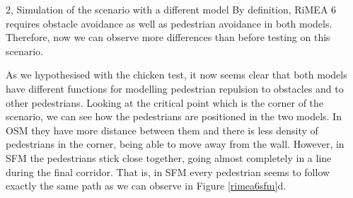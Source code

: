 \begin{task}{2, Simulation of the scenario with a different model}
By definition, RiMEA 6 requires obstacle avoidance as well as pedestrian avoidance in both models. Therefore, now we can observe more differences than before testing on this scenario.

As we hypothesised with the chicken test, it now seems clear that both models have different functions for modelling pedestrian repulsion to obstacles and to other pedestrians. Looking at the critical point which is the corner of the scenario, we can see how the pedestrians are positioned in the two models. In OSM they have more distance between them and there is less density of pedestrians in the corner, being able to move away from the wall. However, in SFM the pedestrians stick close together, going almost completely in a line during the final corridor. That is, in SFM every pedestrian seems to follow exactly the same path as we can observe in Figure \ref{rimea6sfm}d.


\end{task}
